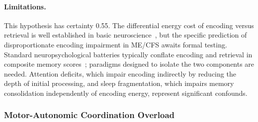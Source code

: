 \begin{hypothesis}
\paragraph{Limitations.}
This hypothesis has certainty 0.55. The differential energy cost of encoding versus retrieval is well established in basic neuroscience~\cite{Kandel2014memory,Dudai2015consolidation}, but the specific prediction of disproportionate encoding impairment in ME/CFS awaits formal testing. Standard neuropsychological batteries typically conflate encoding and retrieval in composite memory scores~\cite{Sebaiti2022cognitive}; paradigms designed to isolate the two components are needed. Attention deficits, which impair encoding indirectly by reducing the depth of initial processing, and sleep fragmentation, which impairs memory consolidation independently of encoding energy, represent significant confounds.
\end{hypothesis}

\subsubsection{Motor-Autonomic Coordination Overload}

